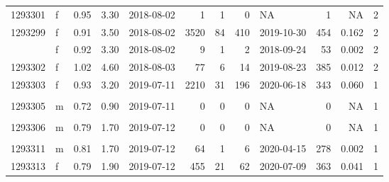 \documentclass[
  number,
  review,
  3p]{elsarticle}
\begin{document}
\begin{table}[H]
\begin{tabular}{llrrlrrrlrrr}
1293301 & f & 0.95 & 3.30 & 2018-08-02 & 1 & 1 & 0 & NA & 1 & NA & 2\\
1293299 & f & 0.91 & 3.50 & 2018-08-02 & 3520 & 84 & 410 & 2019-10-30 & 454 & 0.162 & 2\\
\addlinespace
1293309 & f & 0.92 & 3.30 & 2018-08-02 & 9 & 1 & 2 & 2018-09-24 & 53 & 0.002 & 2\\
1293302 & f & 1.02 & 4.60 & 2018-08-03 & 77 & 6 & 14 & 2019-08-23 & 385 & 0.012 & 2\\
1293303 & f & 0.93 & 3.20 & 2019-07-11 & 2210 & 31 & 196 & 2020-06-18 & 343 & 0.060 & 1\\
\cellcolor[HTML]{E2E2E2}{\textcolor{black}{1293304}} & \cellcolor[HTML]{E2E2E2}{\textcolor{black}{f}} & \cellcolor[HTML]{E2E2E2}{\textcolor{black}{0.72}} & \cellcolor[HTML]{E2E2E2}{\textcolor{black}{1.35}} & \cellcolor[HTML]{E2E2E2}{\textcolor{black}{2019-07-11}} & \cellcolor[HTML]{E2E2E2}{\textcolor{black}{0}} & \cellcolor[HTML]{E2E2E2}{\textcolor{black}{0}} & \cellcolor[HTML]{E2E2E2}{\textcolor{black}{0}} & \cellcolor[HTML]{E2E2E2}{\textcolor{black}{NA}} & \cellcolor[HTML]{E2E2E2}{\textcolor{black}{9}} & \cellcolor[HTML]{E2E2E2}{\textcolor{black}{NA}} & \cellcolor[HTML]{E2E2E2}{\textcolor{black}{1}}\\
1293305 & m & 0.72 & 0.90 & 2019-07-11 & 0 & 0 & 0 & NA & 0 & NA & 1\\
\addlinespace
\cellcolor[HTML]{E2E2E2}{\textcolor{black}{1293310}} & \cellcolor[HTML]{E2E2E2}{\textcolor{black}{m}} & \cellcolor[HTML]{E2E2E2}{\textcolor{black}{0.72}} & \cellcolor[HTML]{E2E2E2}{\textcolor{black}{1.40}} & \cellcolor[HTML]{E2E2E2}{\textcolor{black}{2019-07-11}} & \cellcolor[HTML]{E2E2E2}{\textcolor{black}{0}} & \cellcolor[HTML]{E2E2E2}{\textcolor{black}{0}} & \cellcolor[HTML]{E2E2E2}{\textcolor{black}{0}} & \cellcolor[HTML]{E2E2E2}{\textcolor{black}{NA}} & \cellcolor[HTML]{E2E2E2}{\textcolor{black}{32}} & \cellcolor[HTML]{E2E2E2}{\textcolor{black}{NA}} & \cellcolor[HTML]{E2E2E2}{\textcolor{black}{1}}\\
1293306 & m & 0.79 & 1.70 & 2019-07-12 & 0 & 0 & 0 & NA & 0 & NA & 1\\
\cellcolor[HTML]{E2E2E2}{\textcolor{black}{1293312}} & \cellcolor[HTML]{E2E2E2}{\textcolor{black}{f}} & \cellcolor[HTML]{E2E2E2}{\textcolor{black}{0.91}} & \cellcolor[HTML]{E2E2E2}{\textcolor{black}{2.80}} & \cellcolor[HTML]{E2E2E2}{\textcolor{black}{2019-07-12}} & \cellcolor[HTML]{E2E2E2}{\textcolor{black}{0}} & \cellcolor[HTML]{E2E2E2}{\textcolor{black}{0}} & \cellcolor[HTML]{E2E2E2}{\textcolor{black}{0}} & \cellcolor[HTML]{E2E2E2}{\textcolor{black}{NA}} & \cellcolor[HTML]{E2E2E2}{\textcolor{black}{25}} & \cellcolor[HTML]{E2E2E2}{\textcolor{black}{NA}} & \cellcolor[HTML]{E2E2E2}{\textcolor{black}{1}}\\
1293311 & m & 0.81 & 1.70 & 2019-07-12 & 64 & 1 & 6 & 2020-04-15 & 278 & 0.002 & 1\\
1293313 & f & 0.79 & 1.90 & 2019-07-12 & 455 & 21 & 62 & 2020-07-09 & 363 & 0.041 & 1\\
\bottomrule
\end{tabular}
\end{table}


  
\end{document}
